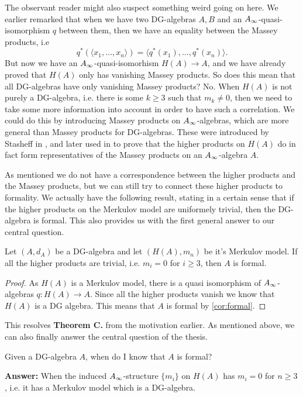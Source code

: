 \begin{remark}
The observant reader might also suspect something weird going on here. We earlier remarked that when we have two DG-algebras $A, B$ and an $A_{\infty}$-quasi-isomorphism $q$ between them, then we have an equality between the Massey products, i.e 
\begin{equation*}
	q^*(\langle x_1, \ldots, x_n\rangle ) = \langle q^*(x_1),\ldots, q^*(x_n)\rangle .
\end{equation*}
But now we have an $A_{\infty}$-quasi-isomorhism $H(A)\longrightarrow A$, and we have already proved that $H(A)$ only has vanishing Massey products. So does this mean that all DG-algebras have only vanishing Massey products? No. When $H(A)$ is not purely a DG-algebra, i.e. there is some $k\geq 3$ such that $m_k\neq 0$, then we need to take some more information into account in order to have such a correlation. We could do this by introducing Massey products on $A_{\infty}$-algebras, which are more general than Massey products for DG-algebras. These were introduced by Stasheff in \cite{h-spaces}, and later used in \cite{infty-massey} to prove that the higher products on $H(A)$ do in fact form representatives of the Massey products on an $A_{\infty}$-algebra $A$.
\end{remark}

As mentioned we do not have a correspondence between the higher products and the Massey products, but we can still try to connect these higher products to formality. We actually have the following result, stating in a certain sense that if the higher products on the Merkulov model are uniformely trivial, then the DG-algebra is formal. This also provides us with the first general answer to our central question.

\begin{theorem}
Let $(A, d_A)$ be a DG-algebra and let $(H(A), m_n)$ be it's Merkulov model. If all the higher products are trivial, i.e. $m_i = 0$ for $i\geq 3$, then $A$ is formal. 
\end{theorem}
\label{thm:formal_iff_no_infty_massey}
\begin{proof}
As $H(A)$ is a Merkulov model, there is a quasi isomorphism of $A_{\infty}$-algebras $q:H(A)\longrightarrow A$. Since all the higher products vanish we know that $H(A)$ is a DG algebra. This means that $A$ is formal by \cref{cor:formal}. 
\end{proof}

This resolves \textbf{Theorem C.} from the motivation earlier. As mentioned above, we can also finally answer the central question of the thesis. 
\begin{central}
Given a DG-algebra $A$, when do I know that $A$ is formal?
\end{central}
\textbf{Answer:} When the induced $A_{\infty}$-structure $\{m_i\}$ on $H(A)$ has $m_i=0$ for $n\geq 3$, i.e. it has a Merkulov model which is a DG-algebra.  

